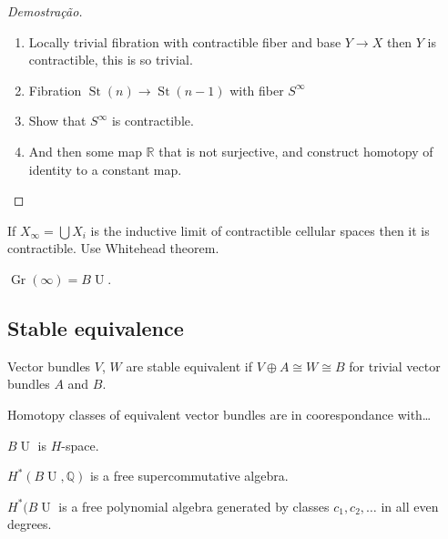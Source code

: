 \begin{proof}[Demostra\c c\~ao]
	\begin{enumerate}[label=\textbf{Step \arabic*}]
		\item Locally trivial fibration with contractible fiber and base $Y\to X$ then $Y$ is contractible, this is so trivial.

		\item Fibration $ \operatorname{St}(n)\to \operatorname{St}(n-1)$ with fiber $S^\infty$ 

		\item Show that $S^\infty$ is contractible.

		\item And then some map $\mathbb{R}$ that is not surjective, and construct homotopy of identity to a constant map.
	\end{enumerate}
\end{proof}

\begin{exercise}
	If $X_{\infty}=\bigcup X_{i} $ is the inductive limit of contractible cellular spaces then it is contractible. Use Whitehead theorem.
\end{exercise}

\begin{thm}[Important]\leavevmode
	$\operatorname{Gr}(\infty)=B\operatorname{U}$.
\end{thm}

\subsection{Stable equivalence}

\begin{defn}
	Vector bundles $V$,  $W$ are stable equivalent if  $V\oplus A\cong W\cong B$ for trivial vector bundles  $A$ and $B$.
\end{defn}

Homotopy classes of equivalent vector bundles are in coorespondance with…

\begin{thm}
	$B\operatorname{U}$ is $H$-space.
\end{thm}

\begin{coro}
	$H^* (B\operatorname{U},\mathbb{Q})$ is a free supercommutative algebra.
\end{coro}

\begin{claim}
	$H^*(B\operatorname{U}$ is a free polynomial algebra generated by classes $c_1,c_2,\ldots$ in all even degrees.
\end{claim}

